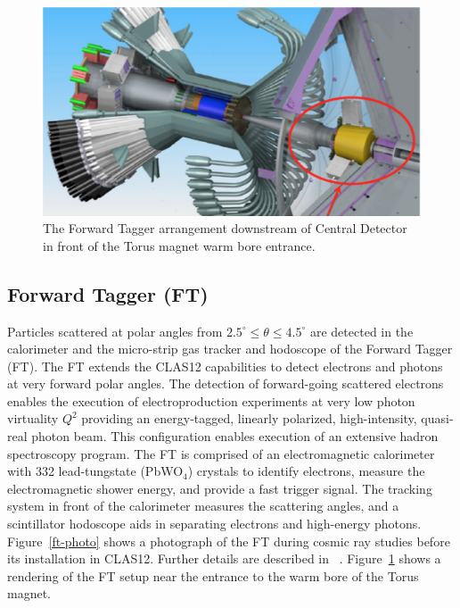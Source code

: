 \documentclass[final,3p,twocolumn]{elsarticle}
\begin{document}
\begin{figure}[htbp!]
\centerline{\includegraphics[width=1.0\columnwidth]{CD-FT.png}}
\caption{ \rm The Forward Tagger arrangement downstream of Central Detector in front of the Torus magnet warm bore entrance.}
\label{ft}
\end{figure}


\subsection{\rm Forward Tagger (FT)}
Particles scattered at polar angles from $2.5^\circ \le \theta \le 4.5^\circ $ are detected in the calorimeter and the micro-strip gas tracker and hodoscope of the Forward Tagger (FT). The FT extends the CLAS12 capabilities to detect 
electrons and photons at very forward polar angles. The detection of forward-going scattered electrons 
enables the execution of electroproduction experiments at very low photon virtuality $Q^2$ providing an energy-tagged, linearly polarized, high-intensity, quasi-real photon beam. This configuration enables execution of an extensive hadron spectroscopy program. The FT is comprised of an electromagnetic calorimeter with 332 lead-tungstate (PbWO$_4$) crystals to identify electrons,  measure the electromagnetic shower energy, and provide a fast trigger signal. The tracking system in front of the calorimeter  measures the scattering angles, and a scintillator hodoscope aids in separating electrons and high-energy photons. 
Figure~\ref{ft-photo} shows a photograph of the FT during cosmic ray studies before its installation in CLAS12. Further details are described in ~\cite{FT}. Figure~\ref{ft} shows a rendering of the FT setup near the entrance 
to the warm bore of the Torus magnet.   
\end{document}
